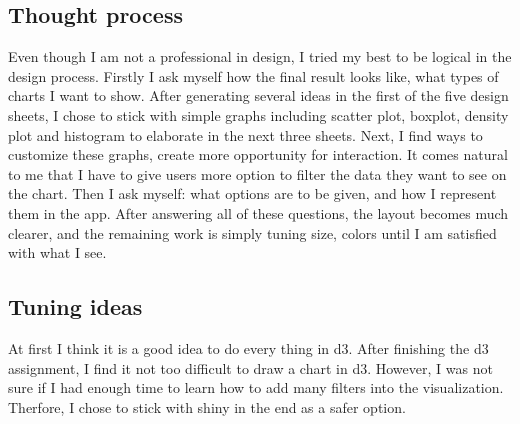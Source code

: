 \documentclass[a4paper,12pt,twoside]{article}
\numberwithin{equation}{section}
\begin{document}
\subsection{Thought process}
Even though I am not a professional in design, I tried my best to be logical in the design process. Firstly I ask myself how the final result looks like, what types of charts I want to show. After generating several ideas in the first of the five design sheets, I chose to stick with simple graphs including scatter plot, boxplot, density plot and histogram to elaborate in the next three sheets. Next, I find ways to customize these graphs, create more opportunity for interaction. It comes natural to me that I have to give users more option to filter the data they want to see on the chart. Then I ask myself: what options are to be given, and how I represent them in the app. After answering all of these questions, the layout becomes much clearer, and the remaining work is simply tuning size, colors until I am satisfied with what I see.


\subsection{Tuning ideas}
At first I think it is a good idea to do every thing in d3. After finishing the d3 assignment, I find it not too difficult to draw a chart in d3. However, I was not sure if I had enough time to learn how to add many filters into the visualization. Therfore, I chose to stick with shiny in the end as a safer option.
\end{document}
